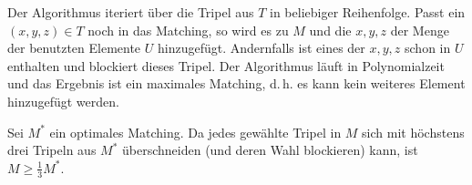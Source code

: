 \documentclass[a4paper]{scrartcl}
\begin{document}
\begin{enumerate}[label=\bfseries \arabic*.]
    Der Algorithmus iteriert über die Tripel aus $T$ in beliebiger Reihenfolge.
    Passt ein $(x,y,z) \in T$ noch in das Matching, so wird es zu $M$ und die
    $x,y,z$ der Menge der benutzten Elemente $U$ hinzugefügt.
    Andernfalls ist eines der $x,y,z$ schon in $U$ enthalten und blockiert
    dieses Tripel.
    Der Algorithmus läuft in Polynomialzeit und das Ergebnis ist ein maximales
    Matching, d.\,h. es kann kein weiteres Element hinzugefügt werden.

    Sei $M^\ast$ ein optimales Matching.
    Da jedes gewählte Tripel in $M$ sich mit höchstens drei Tripeln aus $M^\ast$
    überschneiden (und deren Wahl blockieren) kann, ist $M \geq \frac{1}{3} M^\ast$.

\end{enumerate}
\end{document}
